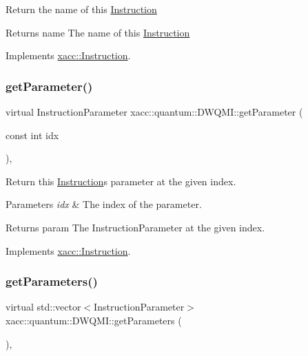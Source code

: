 Return the name of this \hyperlink{a01155}{Instruction}

\begin{DoxyReturn}{Returns}
name The name of this \hyperlink{a01155}{Instruction} 
\end{DoxyReturn}


Implements \hyperlink{a01155_ac7ff23f693e2276edbf3fdac5452792c}{xacc\+::\+Instruction}.

\mbox{\label{a00987_aa15882df55d3f0af3a2ec9d72a2db4c0}} 
\subsubsection{\texorpdfstring{get\+Parameter()}{getParameter()}}
{\footnotesize\ttfamily virtual Instruction\+Parameter xacc\+::quantum\+::\+D\+W\+Q\+M\+I\+::get\+Parameter (\begin{DoxyParamCaption}\item[{const int}]{idx }\end{DoxyParamCaption})\hspace{0.3cm}{\ttfamily [inline]}, {\ttfamily [virtual]}}

Return this \hyperlink{a01155}{Instruction}\textquotesingle{}s parameter at the given index.


\begin{DoxyParams}{Parameters}
{\em idx} & The index of the parameter. \\
\hline
\end{DoxyParams}
\begin{DoxyReturn}{Returns}
param The Instruction\+Parameter at the given index. 
\end{DoxyReturn}


Implements \hyperlink{a01155_aa0d9de97a4833a042379647f83c33ab6}{xacc\+::\+Instruction}.

\mbox{\label{a00987_a896d9a4e2876129c2cf81ef028daf1ff}} 
\subsubsection{\texorpdfstring{get\+Parameters()}{getParameters()}}
{\footnotesize\ttfamily virtual std\+::vector$<$Instruction\+Parameter$>$ xacc\+::quantum\+::\+D\+W\+Q\+M\+I\+::get\+Parameters (\begin{DoxyParamCaption}{ }\end{DoxyParamCaption})\hspace{0.3cm}{\ttfamily [inline]}, {\ttfamily [virtual]}}

